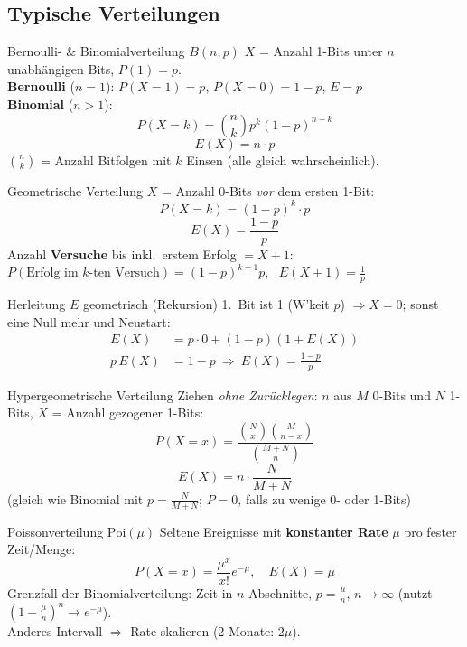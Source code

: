\documentclass[a4paper, fontsize=7pt]{scrartcl}
\begin{document}
\subsection{Typische Verteilungen}

\begin{mainbox}{Bernoulli- \& Binomialverteilung $B(n, p)$}
$X$ = Anzahl 1-Bits unter $n$ unabhängigen Bits, $P(1) = p$.\\
\textbf{Bernoulli} ($n = 1$): $P(X{=}1) = p$, $P(X{=}0) = 1-p$, $E = p$\\
\textbf{Binomial} ($n > 1$):
$$\boxed{P(X = k) = \binom{n}{k} p^k (1-p)^{n-k}}$$
$$\boxed{E(X) = n \cdot p}$$
$\binom{n}{k}$ = Anzahl Bitfolgen mit $k$ Einsen (alle gleich
wahrscheinlich).
\end{mainbox}

\begin{mainbox}{Geometrische Verteilung}
$X$ = Anzahl 0-Bits \emph{vor} dem ersten 1-Bit:
$$\boxed{P(X = k) = (1-p)^k \cdot p}$$
$$\boxed{E(X) = \frac{1-p}{p}}$$
Anzahl \textbf{Versuche} bis inkl.\ erstem Erfolg $= X + 1$:\\
$P(\text{Erfolg im } k\text{-ten Versuch}) = (1-p)^{k-1} p$,
\ $E(X + 1) = \frac{1}{p}$
\end{mainbox}

\begin{subbox}{Herleitung $E$ geometrisch (Rekursion)}
1.\ Bit ist 1 (W'keit $p$) $\Rightarrow X = 0$; sonst eine Null mehr
und Neustart:
\begin{align*}
E(X) &= p \cdot 0 + (1-p)(1 + E(X))\\
p\,E(X) &= 1 - p \ \Rightarrow \ E(X) = \tfrac{1-p}{p}
\end{align*}
\end{subbox}

\begin{mainbox}{Hypergeometrische Verteilung}
Ziehen \emph{ohne Zurücklegen}: $n$ aus $M$ 0-Bits und $N$ 1-Bits,
$X$ = Anzahl gezogener 1-Bits:
$$\boxed{P(X = x) = \frac{\binom{N}{x}\binom{M}{n-x}}{\binom{M+N}{n}}}$$
$$\boxed{E(X) = n \cdot \frac{N}{M+N}}$$
(gleich wie Binomial mit $p = \frac{N}{M+N}$; $P = 0$, falls zu wenige
0- oder 1-Bits)
\end{mainbox}

\begin{mainbox}{Poissonverteilung $\text{Poi}(\mu)$}
Seltene Ereignisse mit \textbf{konstanter Rate} $\mu$ pro fester
Zeit/Menge:
$$\boxed{P(X = x) = \frac{\mu^x}{x!} e^{-\mu}}, \quad
\boxed{E(X) = \mu}$$
Grenzfall der Binomialverteilung: Zeit in $n$ Abschnitte,
$p = \frac{\mu}{n}$, $n \to \infty$ (nutzt
$(1 - \frac{\mu}{n})^n \to e^{-\mu}$).\\
Anderes Intervall $\Rightarrow$ Rate skalieren (2 Monate: $2\mu$).
\end{mainbox}
\end{document}
